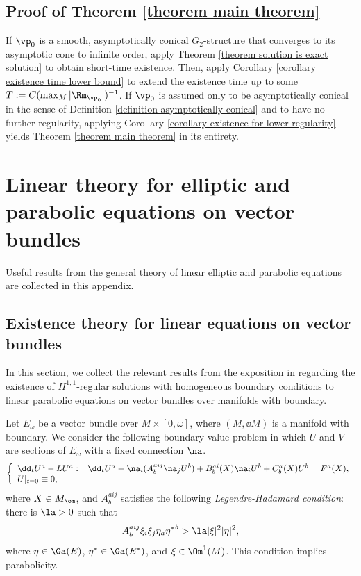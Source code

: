 \documentclass[hidelinks, 12pt, oneside, reqno]{amsart}
\begin{document}
\subsection{Proof of Theorem \ref{theorem main theorem}} If $\vp_0$ is a smooth, asymptotically conical $G_2$-structure that converges to its asymptotic cone to infinite order, apply Theorem \ref{theorem solution is exact solution} to obtain short-time existence. Then, apply Corollary \ref{corollary existence time lower bound} to extend the existence time up to some $T := C(\max_M |\Rm_{\vp_0}|)^{-1}$. If $\vp_0$ is assumed only to be asymptotically conical in the sense of Definition \ref{definition asymptotically conical} and to have no further regularity, applying Corollary \ref{corollary existence for lower regularity} yields Theorem \ref{theorem main theorem} in its entirety. 

\appendix

\section{Linear theory for elliptic and parabolic equations on vector bundles}\label{section linear parabolic appdx}

Useful results from the general theory of linear elliptic and parabolic equations are collected in this appendix.

\subsection{Existence theory for linear equations on vector bundles}\label{subsection existence parabolic pde}

In this section, we collect the relevant results from the exposition in \cite{Baker} regarding the existence of $H^{1,1}$-regular solutions with homogeneous boundary conditions to linear parabolic equations on vector bundles over manifolds with boundary. 

Let $E_{\omega}$ be a vector bundle over $M \times [0,\omega]$, where $(M, \dd M)$ is a manifold with boundary. We consider the following boundary value problem in which $U$ and $V$ are sections of $E_{\omega}$ with a fixed connection $\na$. 
\begin{equation}\label{equation linear parabolic pde}
\left\{
\begin{array}{lr}
\dd_t U^a - LU^a := \dd_t U^a - \na_i(A^{aij}_b\na_j U^b) + B^{ai}_b(X) \na_i U^b + C^a_b(X) U^b = F^a(X),   \\
U|_{t= 0} \equiv 0 , 
\end{array}
\right.
\end{equation}
where $X \in M_\om $, and $A^{aij}_b$ satisfies the following \textit{Legendre-Hadamard condition}: there is $\la > 0$ such that
\[
A^{aij}_b\xi_i \xi_j\eta_a{\eta^*}^b > \la |\xi|^2|\eta|^2,
\]
where $\eta \in \Ga(E)$, $\eta^* \in \Ga(E^*)$, and $\xi \in \Om^1(M)$. This condition implies parabolicity.
\end{document}

